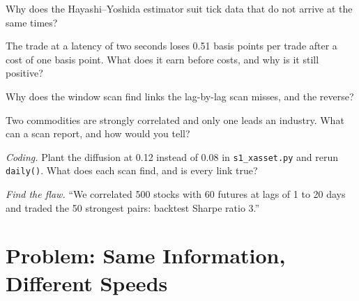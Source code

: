 \begin{exercise}[$\star$]\label{exo:s1:cross-asset-lead-lag:3}
Why does the Hayashi--Yoshida estimator suit tick data that do not arrive at the same times?
\end{exercise}

\begin{exercise}[$\star\star$]\label{exo:s1:cross-asset-lead-lag:4}
The trade at a latency of two seconds loses 0.51 basis points per trade after a cost of one basis point. What does it earn before costs, and why is it
still positive?
\end{exercise}

\begin{exercise}[$\star\star$]\label{exo:s1:cross-asset-lead-lag:5}
Why does the window scan find links the lag-by-lag scan misses, and the reverse?
\end{exercise}

\begin{exercise}[$\star\star$]\label{exo:s1:cross-asset-lead-lag:6}
Two commodities are strongly correlated and only one leads an industry. What can a scan report, and how would you tell?
\end{exercise}

\begin{exercise}[$\star\star\star$]\label{exo:s1:cross-asset-lead-lag:7}
\emph{Coding.} Plant the diffusion at 0.12 instead of 0.08 in \texttt{s1\_xasset.py} and rerun \texttt{daily()}. What does each scan find, and is every
link true?
\end{exercise}

\begin{exercise}[$\star\star\star$]\label{exo:s1:cross-asset-lead-lag:8}
\emph{Find the flaw.} ``We correlated 500 stocks with 60 futures at lags of 1 to 20 days and traded the 50 strongest pairs: backtest Sharpe ratio 3.''
\end{exercise}

\section{Problem: Same Information, Different Speeds}

